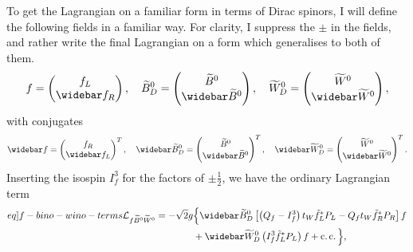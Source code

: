 \documentclass[english, notitlepage]{article}
\begin{document}
            To get the Lagrangian on a familiar form in terms of Dirac spinors, I will define the following fields in a familiar way.
            For clarity, I suppress the \(\pm\) in the fields, and rather write the final Lagrangian on a form which generalises to both of them.
            \begin{align}
                f = \begin{pmatrix}
                        f_L \\ \wbar{f}_R
                    \end{pmatrix},
                \quad
                \wtilde{B}^0_D = \begin{pmatrix}
                                     \wtilde{B}^0 \\ \wbar{\wtilde{B}}^0
                                 \end{pmatrix},
                \quad
                \wtilde{W}^0_D = \begin{pmatrix}
                                     \wtilde{W}^0 \\ \wbar{\wtilde{W}}^0
                                 \end{pmatrix},
            \end{align}
            with conjugates
            \begin{align}
                \wbar{f} = \begin{pmatrix}
                               f_R \\ \wbar{f}_L
                           \end{pmatrix}^T,
                \quad
                \wbar{\wtilde{B}}^0_D = \begin{pmatrix}
                                            \wtilde{B}^0 \\ \wbar{\wtilde{B}}^0
                                        \end{pmatrix}^T,
                \quad
                \wbar{\wtilde{W}}^0_D = \begin{pmatrix}
                                            \wtilde{W}^0 \\ \wbar{\wtilde{W}}^0
                                        \end{pmatrix}^T.
            \end{align}
            Inserting the isospin $I^3_f$ for the factors of $\pm\frac{1}{2}$, we have the ordinary Lagrangian term
            \begin{align}
                \label[eq]{f-bino-wino-terms}
                \nonumber
                \L_{f\bino\wino} = -\sqrt{2} g & \Big\{ \wbar{\wtilde{B}}^0_D \bclosed{ \pclosed{Q_f - I^3_f}t_W \tilde{f}_L^* P_L - Q_f t_W \tilde{f}_R^* P_R } f \\
                                               & + \wbar{\wtilde{W}}^0_D \pclosed{I^3_f \tilde{f}_L^* P_L} f + \cc \Big\},
            \end{align}
\end{document}

